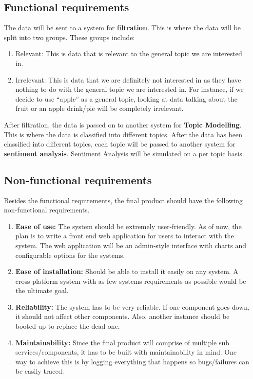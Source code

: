 \documentclass[12pt, a4paper]{article}
\begin{document}
\subsection{Functional requirements}
The data will be sent to a system for \textbf{filtration}. This is where the data will be split into
two groups. These groups include:
\begin{enumerate}
  \item Relevant: This is data that is relevant to the general topic we are interested in.
  \item Irrelevant: This is data that we are definitely not interested in as they have nothing to do
    with the general topic we are interested in. For instance, if we decide to use ``apple'' as a
    general topic, looking at data talking about the fruit or an apple drink/pie will be completely
    irrelevant.
\end{enumerate}

After filtration, the data is passed on to another system for \textbf{Topic Modelling}. This is
where the data is classified into different topics. After the data has been classified into
different topics, each topic will be passed to another system for \textbf{sentiment analysis}.
Sentiment Analysis will be simulated on a per topic basis.

\subsection{Non-functional requirements}
Besides the functional requirements, the final product should have the following non-functional
requirements.
\begin{enumerate}
  \item \textbf{Ease of use:} The system should be extremely user-friendly. As of now, the plan is
    to write a front end web application for users to interact with the system. The web application
    will be an admin-style interface with charts and configurable options for the systems.
  \item \textbf{Ease of installation:} Should be able to install it easily on any system. A
    cross-platform system with as few systems requirements as possible would be the ultimate goal.
  \item \textbf{Reliability:} The system has to be very reliable. If one component goes down, it
    should not affect other components. Also, another instance should be booted up to replace the
    dead one.
  \item \textbf{Maintainability:} Since the final product will comprise of multiple sub
    services/components, it has to be built with maintainability in mind. One way to achieve this
    is by logging everything that happens so bugs/failures can be easily traced.
\end{enumerate}
\end{document}
